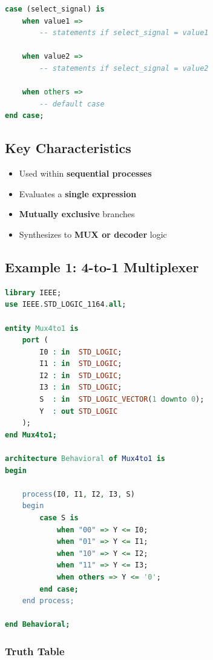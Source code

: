 \documentclass[12pt,a4paper]{article}
\begin{document}
\begin{lstlisting}[language=VHDL]
case (select_signal) is
    when value1 =>
        -- statements if select_signal = value1
    
    when value2 =>
        -- statements if select_signal = value2
    
    when others =>
        -- default case
end case;
\end{lstlisting}

\subsection{Key Characteristics}
\begin{itemize}
    \item Used within \textbf{sequential processes}
    \item Evaluates a \textbf{single expression}
    \item \textbf{Mutually exclusive} branches
    \item Synthesizes to \textbf{MUX or decoder} logic
\end{itemize}

\subsection{Example 1: 4-to-1 Multiplexer}

\begin{lstlisting}[language=VHDL]
library IEEE;
use IEEE.STD_LOGIC_1164.all;

entity Mux4to1 is
    port (
        I0 : in  STD_LOGIC;
        I1 : in  STD_LOGIC;
        I2 : in  STD_LOGIC;
        I3 : in  STD_LOGIC;
        S  : in  STD_LOGIC_VECTOR(1 downto 0);
        Y  : out STD_LOGIC
    );
end Mux4to1;

architecture Behavioral of Mux4to1 is
begin
    
    process(I0, I1, I2, I3, S)
    begin
        case S is
            when "00" => Y <= I0;
            when "01" => Y <= I1;
            when "10" => Y <= I2;
            when "11" => Y <= I3;
            when others => Y <= '0';
        end case;
    end process;
    
end Behavioral;
\end{lstlisting}

\subsubsection{Truth Table}
\end{document}
